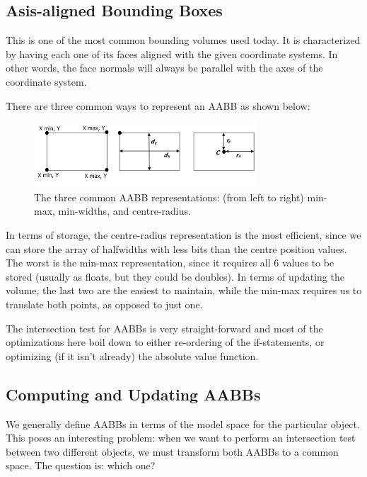 \documentclass[11pt, letterpaper, oneside]{article}
\begin{document}
      \subsection{Asis-aligned Bounding Boxes}
        This is one of the most common bounding volumes used today. It is
        characterized by having each one of its faces aligned with the given
        coordinate systems. In other words, the face normals will always be
        parallel with the axes of the coordinate system.

        There are three common ways to represent an AABB as shown below:
        \begin{figure}[h]
          \caption{The three common AABB representations: (from left to right)
          min-max, min-widths, and centre-radius.}
          \label{aabb_representations}
          \includegraphics[width=\textwidth]{images/aabb_representations}
        \end{figure}

        In terms of storage, the centre-radius representation is the most
        efficient, since we can store the array of halfwidths with less bits
        than the centre position values. The worst is the min-max
        representation, since it requires all 6 values to be stored (usually as
        floats, but they could be doubles). In terms of updating the volume, the
        last two are the easiest to maintain, while the min-max requires us to
        translate both points, as opposed to just one.

        The intersection test for AABBs is very straight-forward and most of the
        optimizations here boil down to either re-ordering of the if-statements,
        or optimizing (if it isn't already) the absolute value function.

      \subsection{Computing and Updating AABBs}
        We generally define AABBs in terms of the model space for the particular
        object. This poses an interesting problem: when we want to perform an
        intersection test between two different objects, we must transform both
        AABBs to a common space. The question is: which one?
        
\end{document}
